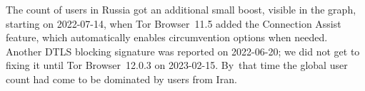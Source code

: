 \documentclass[letterpaper,twocolumn]{article}
\begin{document}
The count of users in Russia got an additional small boost,
visible in the graph,
starting on \mbox{2022-07-14},
when Tor Browser~11.5 added the Connection Assist feature,
which automatically enables circumvention options when needed.
Another DTLS blocking signature was reported on \mbox{2022-06-20};
we did not get to fixing it until Tor Browser~12.0.3 on \mbox{2023-02-15}.
By~that time the global user count had come to be dominated by users from Iran.
\end{document}
